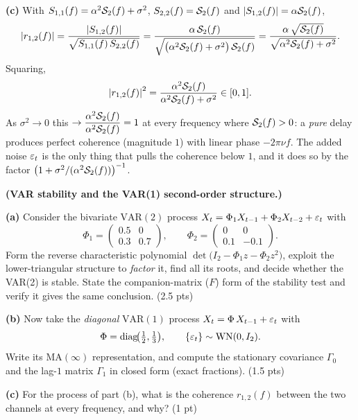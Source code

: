 \documentclass[11pt]{article}
\DeclareMathOperator{\diag}{diag}
\begin{document}
\textbf{(c)} With $S_{1,1}(f)=\alpha^2\mathcal{S}_2(f)+\sigma^2$, $S_{2,2}(f)=\mathcal{S}_2(f)$ and $\left\lvert S_{1,2}(f) \right\rvert=\alpha\mathcal{S}_2(f)$,
\[
\left\lvert r_{1,2}(f) \right\rvert
=\frac{\left\lvert S_{1,2}(f) \right\rvert}{\sqrt{S_{1,1}(f)\,S_{2,2}(f)}}
=\frac{\alpha\,\mathcal{S}_2(f)}{\sqrt{\bigl(\alpha^2\mathcal{S}_2(f)+\sigma^2\bigr)\,\mathcal{S}_2(f)}}
=\frac{\alpha\,\sqrt{\mathcal{S}_2(f)}}{\sqrt{\alpha^2\mathcal{S}_2(f)+\sigma^2}} .
\]
Squaring,
\[
\left\lvert r_{1,2}(f) \right\rvert^2=\frac{\alpha^2\mathcal{S}_2(f)}{\alpha^2\mathcal{S}_2(f)+\sigma^2}\in[0,1].
\]
As $\sigma^2\to0$ this $\to\dfrac{\alpha^2\mathcal{S}_2(f)}{\alpha^2\mathcal{S}_2(f)}=1$ at every frequency where $\mathcal{S}_2(f)>0$: a \emph{pure} delay produces perfect coherence (magnitude $1$) with linear phase $-2\pi\nu f$. The added noise $\varepsilon_t$ is the only thing that pulls the coherence below $1$, and it does so by the factor $\bigl(1+\sigma^2/(\alpha^2\mathcal{S}_2(f))\bigr)^{-1}$.

\statementstart
\textbf{(VAR stability and the VAR(1) second-order structure.)}

\textbf{(a)} Consider the bivariate $\mathrm{VAR}(2)$ process $X_t=\Phi_1X_{t-1}+\Phi_2X_{t-2}+\varepsilon_t$ with
\[
\Phi_1=\begin{pmatrix}0.5 & 0\\[2pt] 0.3 & 0.7\end{pmatrix},\qquad
\Phi_2=\begin{pmatrix}0 & 0\\[2pt] 0.1 & -0.1\end{pmatrix}.
\]
Form the reverse characteristic polynomial $\det\bigl(I_2-\Phi_1 z-\Phi_2 z^2\bigr)$, exploit the lower-triangular structure to \emph{factor} it, find all its roots, and decide whether the VAR(2) is stable. State the companion-matrix ($F$) form of the stability test and verify it gives the same conclusion. \hfill(2.5 pts)

\textbf{(b)} Now take the \emph{diagonal} $\mathrm{VAR}(1)$ process $X_t=\Phi\,X_{t-1}+\varepsilon_t$ with
\[
\Phi=\diag\!\bigl(\tfrac12,\tfrac13\bigr),\qquad
\{\eps_t\}\sim\mathrm{WN}(0,I_2).
\]
Write its $\mathrm{MA}(\infty)$ representation, and compute the stationary covariance $\Gamma_0$ and the lag-$1$ matrix $\Gamma_1$ in closed form (exact fractions). \hfill(1.5 pts)

\textbf{(c)} For the process of part (b), what is the coherence $r_{1,2}(f)$ between the two channels at every frequency, and why? \hfill(1 pt)
\statementend
\end{document}
